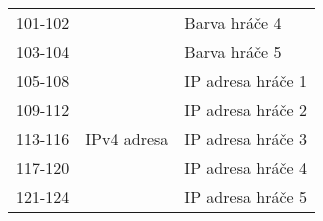 \begin{table}[hbtp]
\begin{tabular}{|c|c|l|}
101-102 &             & Barva hráče 4                                                   \\ \cline{1-1} \cline{3-3} 
103-104 &             & Barva hráče 5                                                   \\ \hline
105-108 &             & IP adresa hráče 1                                               \\ \cline{1-1} \cline{3-3} 
109-112 &             & IP adresa hráče 2                                               \\ \cline{1-1} \cline{3-3} 
113-116 & IPv4 adresa & IP adresa hráče 3                                               \\ \cline{1-1} \cline{3-3} 
117-120 &             & IP adresa hráče 4                                               \\ \cline{1-1} \cline{3-3} 
121-124 &             & IP adresa hráče 5                                               \\ \hline
\end{tabular}
\end{table}